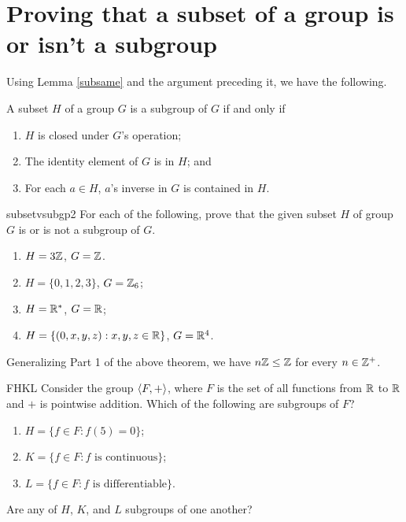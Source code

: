 \section{Proving that a subset of a group is or isn't a subgroup}

Using Lemma \ref{subsame} and the argument preceding it, we
have the following.
\begin{thm}\label{subgp} A subset $H$ of a group $G$ is a subgroup of $G$ if and only if
\begin{enumerate}
\item $H$ is closed under $G$'s operation;
\item The identity element of $G$ is in $H$; and
\item For each $a\in H$, $a$'s inverse in $G$ is contained in $H$. \end{enumerate}
\end{thm}

\begin{example}{subsetvsubgp2} For each of the following, prove that the given subset $H$ of group $G$ is or is not a subgroup of $G$.
\begin{enumerate}
\item $H=3\mathbb{Z}$, $G=\mathbb{Z}$.
\item $H=\{0,1,2,3\}$, $G=\mathbb{Z}_6$;
\item $H=\mathbb{R}^*$, $G=\mathbb{R}$;
\item $H=\{(0,x,y,z):x,y,z\in \mathbb{R}\}$, $G=\mathbb{R}^4$. \end{enumerate}
\end{example}

\begin{example}
Generalizing Part 1 of the above theorem, we have $n\mathbb{Z}\leq \mathbb{Z}$ for every $n\in \mathbb{Z}^+$. \end{example}

\begin{example}{FHKL} Consider the group $\langle F,+\rangle$, where $F$ is the set of all functions from $\mathbb{R}$ to $\mathbb{R}$ and $+$ is pointwise addition. Which of the following are subgroups of $F$?
\begin{enumerate}
\item[] $H=\{f\in F: f(5)=0\}$;
\item[] $K=\{f\in F: f \mbox{ is continuous}\}$;
\item[] $L=\{f\in F: f \mbox{ is differentiable}\}$.
\end{enumerate}
Are any of $H$, $K$, and $L$ subgroups of one another? \end{example}

